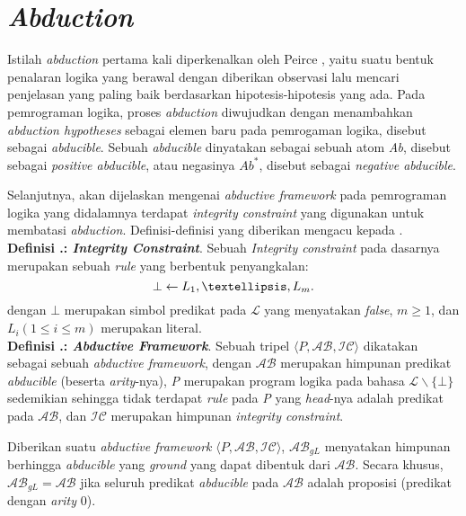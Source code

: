 \section{\textit{Abduction}}

Istilah \textit{abduction} pertama kali diperkenalkan oleh Peirce \citep{quine1933collected}, yaitu suatu bentuk penalaran logika yang berawal dengan diberikan observasi lalu mencari penjelasan yang paling baik berdasarkan hipotesis-hipotesis yang ada. Pada pemrograman logika, proses \textit{abduction} diwujudkan dengan menambahkan \textit{abduction hypotheses} sebagai elemen baru pada pemrogaman logika, disebut sebagai \textit{abducible}. Sebuah \textit{abducible} dinyatakan sebagai sebuah atom \textit{Ab}, disebut sebagai \textit{positive abducible}, atau negasinya $Ab^*$, disebut sebagai \textit{negative abducible}.

Selanjutnya, akan dijelaskan mengenai \textit{abductive framework} pada pemrograman logika \citep{kakas1992abductive} yang didalamnya terdapat \textit{integrity constraint} yang digunakan untuk membatasi \textit{abduction}. Definisi-definisi yang diberikan mengacu kepada \citep{alferes2004abduction}.
\\

\noindent \textbf{Definisi \thebabDuaNum.\thedefBabDua: \textit{Integrity Constraint}}. Sebuah \textit{Integrity constraint} pada dasarnya merupakan sebuah \textit{rule} yang berbentuk penyangkalan:
\begin{displaymath}
\bot \leftarrow L_1, \textellipsis , L_m.
\end{displaymath}
dengan $\bot$ merupakan simbol predikat pada $\mathcal{L}$ yang menyatakan \textit{false}, $m \geq 1$, dan $L_i (1 \leq i \leq m)$ merupakan literal.
\\

\noindent \textbf{Definisi \thebabDuaNum.\thedefBabDua: \textit{Abductive Framework}}. Sebuah tripel $\langle P, \mathcal{AB}, \mathcal{IC} \rangle$ dikatakan sebagai sebuah \textit{abductive framework}, dengan $\mathcal{AB}$ merupakan himpunan predikat \textit{abducible} (beserta \textit{arity}-nya), \textit{P} merupakan program logika pada bahasa $\mathcal{L} \backslash \{\bot \}$ sedemikian sehingga tidak terdapat \textit{rule} pada \textit{P} yang \textit{head}-nya adalah predikat pada $\mathcal{AB}$, dan $\mathcal{IC}$ merupakan himpunan \textit{integrity constraint}.

Diberikan suatu \textit{abductive framework} $\langle P, \mathcal{AB}, \mathcal{IC} \rangle$, $\mathcal{AB}_{gL}$ menyatakan himpunan berhingga \textit{abducible} yang \textit{ground} yang dapat dibentuk dari $\mathcal{AB}$. Secara khusus, $\mathcal{AB}_{gL} = \mathcal{AB}$ jika seluruh predikat \textit{abducible} pada $\mathcal{AB}$ adalah proposisi (predikat dengan \textit{arity} 0).
\\

